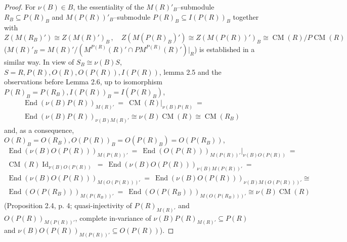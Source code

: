 \documentclass[10pt,a4paper]{amsart}
\DeclareMathOperator{\CM}{CM}
\DeclareMathOperator{\End}{End}
\DeclareMathOperator{\Id}{Id}
\begin{document}
\begin{proof}
For ${\nu(B)\in B}$, the essentiality of the $M(R)'_B$--submodule 
${R_B\subseteq P(R)_B}$ and $M(P(R))'_B$--submodule 
${P(R)_B\subseteq I(P(R))_B}$ together with   
\[
Z(M(R_B)') \cong Z(M(R)')_B\,,\quad 
Z(M(P(R)_B)')\cong Z(M(P(R))')_B\cong \CM(R)/P \CM(R)
\]
(${M(R)'_B=M(R)'/(M^{P(R)}(R)'\cap P M^{P(R)}(R)')|_R}$) is established in a 
similar way. In view of ${S_B\cong \nu(B) S}$, ${S=R, P(R), O(R), 
O(P(R)), I(P(R))}$, lemma 2.5 and the observations before Lemma 2.6, up to 
isomorphism ${P(R)_B=P(R_B), I(P(R))_B=I(P(R)_B)}$, 
\begin{multline*}
\End(\nu(B) P(R))_{M(R)'}\ =\ \CM(R)|_{\nu(B) P(R)}\ =
\\ 
\End(\nu(B) P(R))_{\nu(B) M(R)'}\cong 
\nu(B) \CM(R)\cong \CM(R_B)
\end{multline*}
and, as a consequence, ${O(R)_B=O(R_B), O(P(R))_B=O(P(R)_B)=O(P(R_B))}$,
\begin{multline*}
\End(\nu(B) O(P(R)))_{M(P(R))'}\ =\ 
\End(O(P(R)))_{M(P(R))'}|_{\nu(B) O(P(R))}\ =
\\ 
\CM(R) \Id_{\nu(B) O(P(R))}\ =\ 
\End(\nu(B) O(P(R)))_{\nu(B) M(P(R))'}\ =
\\  
\End(\nu(B) O(P(R)))_{M(O(P(R)))'}\ =\ 
\End(\nu(B) O(P(R)))_{\nu(B) M(O(P(R)))'}\cong
\\ 
\End(O(P(R_B)))_{M(P(R_B))'}\ =\ \End(O(P(R_B)))_{M(O(P(R_B)))'}\cong 
\nu(B) \CM(R)
\end{multline*}
(Proposition 2.4, p. 4; quasi-injectivity of $P(R)_{M(R)'}$ and 
$O(P(R))_{M(P(R))'}$, complete in-\linebreak variance of ${\nu(B) P(R)_{M(R)'}\subseteq 
P(R)}$ and ${\nu(B) O(P(R))_{M(P(R))'}\subseteq O(P(R))}$). 
\end{proof}
\end{document}
